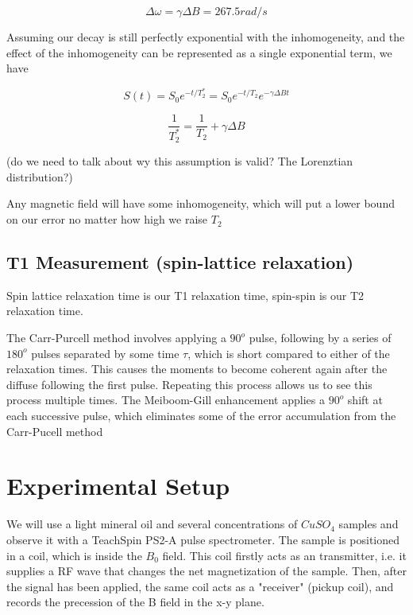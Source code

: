 \documentclass[12pt]{article}
\begin{document}
\[\Delta \omega = \gamma \Delta B = 267.5 rad/s\]

Assuming our decay is still perfectly exponential with the inhomogeneity, and the effect of the inhomogeneity can be represented as a single exponential term, we have

\[S(t)=S_0e^{-t/T_2^*} = S_0e^{-t/T_2}e^{-\gamma \Delta B t}\]

\[\frac{1}{T_2^*} = \frac{1}{T_2} + \gamma \Delta B\]

(do we need to talk about wy this assumption is valid? The Lorenztian distribution?)

Any magnetic field will have some inhomogeneity, which will put a lower bound on our error no matter how high we raise $T_2$

\subsection{T1 Measurement (spin-lattice relaxation)}

Spin lattice relaxation time is our T1 relaxation time, spin-spin is our T2 relaxation time.

The Carr-Purcell method involves applying a $90^o$ pulse, following by a series of $180^o$ pulses separated by some time $\tau$, which is short compared to either of the relaxation times. This causes the moments to become coherent again after the diffuse following the first pulse. Repeating this process allows us to see this process multiple times. The Meiboom-Gill enhancement applies a $90^o$ shift at each successive pulse, which eliminates some of the error accumulation from the Carr-Pucell method


\section{ Experimental Setup}

We will use a light mineral oil and several concentrations of $CuSO_4$ samples and observe it with a TeachSpin PS2-A pulse spectrometer.
The sample is positioned in a coil, which is inside the $B_0$ field. This coil firstly acts as an transmitter, i.e. it supplies a RF wave that changes the net magnetization of the sample. Then, after the signal has been applied, the same coil acts as a "receiver" (pickup coil), and records the precession of the B field in the x-y plane.
\end{document}

